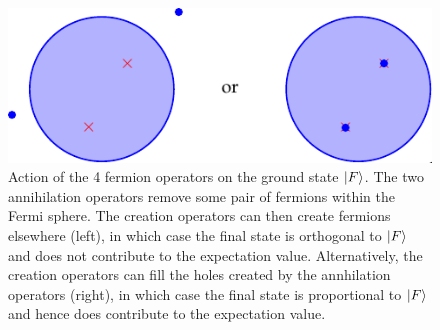 \begin{figure}[htbp]
    \centering
    \includegraphics[]{Images/fig-fourfermionopargument.pdf}
    \caption{Action of the 4 fermion operators on the ground state $\lvert F \rangle$. The two annihilation operators remove some pair of fermions within the Fermi sphere. The creation operators can then create fermions elsewhere (left), in which case the final state is orthogonal to $\lvert F \rangle$ and does not contribute to the expectation value. Alternatively, the creation operators can fill the holes created by the annhilation operators (right), in which case the final state is proportional to $\lvert F \rangle$ and hence does contribute to the expectation value.}
    \label{fig-fourfermionopargument}
\end{figure}

